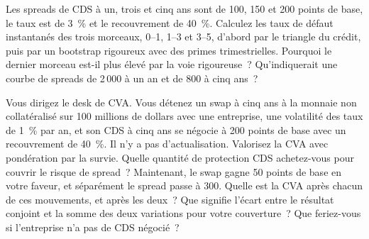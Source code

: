 \begin{question}\label{iq:iv2:credit-and-xva:19}
Les spreads de CDS à un, trois et cinq ans sont de 100, 150 et 200 points de base, le taux est de 3~\% et le recouvrement de 40~\%. Calculez les taux de défaut instantanés des trois morceaux, 0--1, 1--3 et 3--5, d'abord par le triangle du crédit, puis par un bootstrap rigoureux avec des primes trimestrielles. Pourquoi le dernier morceau est-il plus élevé par la voie rigoureuse~? Qu'indiquerait une courbe de spreads de 2\,000 à un an et de 800 à cinq ans~?
\end{question}

\begin{question}\label{iq:iv2:credit-and-xva:20}
Vous dirigez le desk de CVA. Vous détenez un swap à cinq ans à la monnaie non collatéralisé sur 100 millions de dollars avec une entreprise, une volatilité des taux de 1~\% par an, et son CDS à cinq ans se négocie à 200 points de base avec un recouvrement de 40~\%. Il n'y a pas d'actualisation. Valorisez la CVA avec pondération par la survie. Quelle quantité de protection CDS achetez-vous pour couvrir le risque de spread~? Maintenant, le swap gagne 50 points de base en votre faveur, et séparément le spread passe à 300. Quelle est la CVA après chacun de ces mouvements, et après les deux~? Que signifie l'écart entre le résultat conjoint et la somme des deux variations pour votre couverture~? Que feriez-vous si l'entreprise n'a pas de CDS négocié~?
\end{question}
